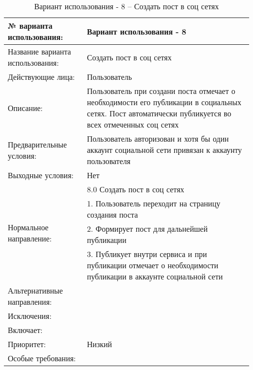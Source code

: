 \begin{table}[H]
  \caption{\onehalfspacing Вариант использования - 8 – Создать пост в соц сетях}\label{use-case-8-table}
  \begin{tabular}{|p{6cm}|p{10cm}|}
  \hline № варианта использования: & Вариант использования - 8 \\
  \hline Название варианта использования: & Создать пост в соц сетях \\
  \hline Действующие лица: & Пользователь \\
  \hline Описание: & Пользователь при создани поста отмечает о необходимости его публикации в социальных сетях. Пост автоматически публикуется во всех отмеченных соц сетях \\
  \hline Предварительные условия: & Пользователь авторизован и хотя бы один аккаунт социальной сети привязан к аккаунту пользователя \\
  \hline Выходные условия: & Нет \\
  \hline \multirow{4}{*}{Нормальное направление:} & 8.0 Создать пост в соц сетях \\
  \cline{2-2} & 1. Пользователь переходит на страницу создания поста \\
  \cline{2-2} & 2. Формирует пост для дальнейшей публикации \\
  \cline{2-2} & 3. Публикует внутри сервиса и при публикации отмечает о необходимости публикации в аккаунте социальной сети \\
  \hline Альтернативные направления: &  \\
  \hline Исключения: &  \\
  \hline Включает: &  \\
  \hline Приоритет: & Низкий \\
  \hline Особые требования: &  \\
  \hline 
  \end{tabular}
\end{table}

